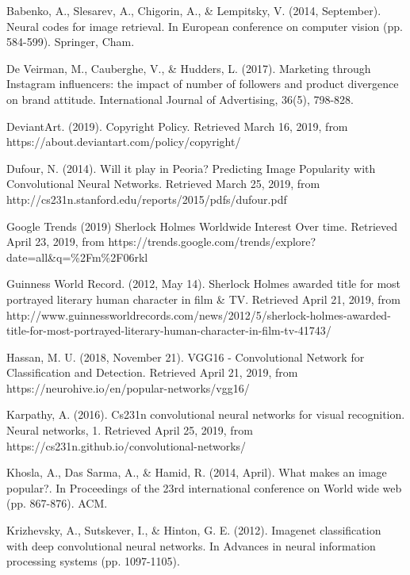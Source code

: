 \documentclass[11pt]{article}
\begin{document}
\begin{thebibliography}{9}

Babenko, A., Slesarev, A., Chigorin, A., \& Lempitsky, V. (2014,
September). Neural codes for image retrieval. In European conference on
computer vision (pp. 584-599). Springer, Cham.

De Veirman, M., Cauberghe, V., \& Hudders, L. (2017). Marketing through
Instagram influencers: the impact of number of followers and product
divergence on brand attitude. International Journal of Advertising,
36(5), 798-828.

DeviantArt. (2019). Copyright Policy. Retrieved March 16, 2019, from
https://about.deviantart.com/policy/copyright/

Dufour, N. (2014). Will it play in Peoria? Predicting Image Popularity with Convolutional Neural Networks. Retrieved March 25, 2019, from http://cs231n.stanford.edu/reports/2015/pdfs/dufour.pdf

Google Trends (2019) Sherlock Holmes Worldwide Interest Over time.
Retrieved April 23, 2019, from
https://trends.google.com/trends/explore?date=all\&q=\%2Fm\%2F06rkl

Guinness World Record. (2012, May 14). Sherlock Holmes awarded title for
most portrayed literary human character in film \& TV. Retrieved April
21, 2019, from
http://www.guinnessworldrecords.com/news/2012/5/sherlock-holmes-awarded-title-for-most-portrayed-literary-human-character-in-film-tv-41743/

Hassan, M. U. (2018, November 21). VGG16 - Convolutional Network for
Classification and Detection. Retrieved April 21, 2019, from
https://neurohive.io/en/popular-networks/vgg16/

Karpathy, A. (2016). Cs231n convolutional neural networks for visual
recognition. Neural networks, 1. Retrieved April 25, 2019, from
https://cs231n.github.io/convolutional-networks/

Khosla, A., Das Sarma, A., \& Hamid, R. (2014, April). What makes an
image popular?. In Proceedings of the 23rd international conference on
World wide web (pp. 867-876). ACM.

Krizhevsky, A., Sutskever, I., \& Hinton, G. E. (2012). Imagenet
classification with deep convolutional neural networks. In Advances in
neural information processing systems (pp. 1097-1105).


\end{thebibliography}
\end{document}
